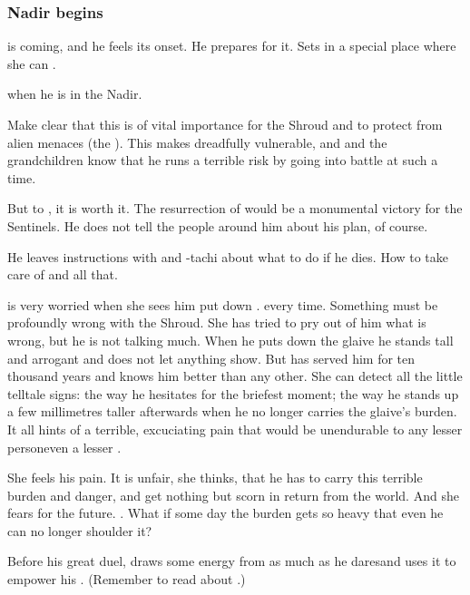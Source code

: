 \subsubsection{Nadir begins}
 is coming, and he feels its onset. 
He prepares for it. 
Sets \Rystessakhin{} in a special place where she can . 

\Ishnaruchaefir {} when he is in the Nadir. 

Make clear that this is of vital importance for the Shroud and to protect \Miith{} from alien menaces (the \banes). 
This makes \Ishnaruchaefir{} dreadfully vulnerable, and \Criseis{} and the grandchildren know that he runs a terrible risk by going into battle at such a time. 

But to \Ishnaruchaefir, it is worth it. 
The resurrection of \Nithdornazsh{} would be a monumental victory for the Sentinels. 
He does not tell the people around him about his plan, of course. 

He leaves instructions with \Criseis{} and \Thiencaste-tachi about what to do if he dies. 
How to take care of \Rystessakhin{} and all that. 

\Criseis{} is very worried when she sees him put down \Rystessakhin. 
 every time. 
Something must be profoundly wrong with the Shroud. 
She has tried to pry out of him what is wrong, but he is not talking much. 
When he puts down the glaive he stands tall and arrogant and does not let anything show. 
But \Criseis{} has served him for ten thousand years and knows him better than any other. 
She can detect all the little telltale signs: 
the way he hesitates for the briefest moment; the way he stands up a few millimetres taller afterwards when he no longer carries the glaive's burden. 
It all hints of a terrible, excuciating pain that would be unendurable to any lesser person\prikker even a lesser \dragon. 

She feels his pain. 
It is unfair, she thinks, that he has to carry this terrible burden and danger, and get nothing but scorn in return from the world. 
And she fears for the future. 
. 
What if some day the burden gets so heavy that even he can no longer shoulder it? 

Before his great duel, \Ishnaruchaefir{} draws some energy from \Rystessakhin \dash as much as he dares\dash and uses it to empower his . 
(Remember to read about .)

